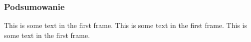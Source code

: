 \begin{frame}
    \frametitle{Podsumowanie}
    This is some text in the first frame. This is some text in the first frame. This is some text in the first frame.
\end{frame}